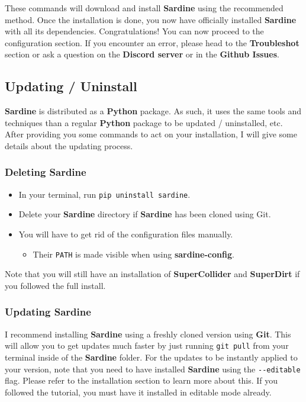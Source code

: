 \documentclass[11pt]{article}
\begin{document}
These commands will download and install \textbf{Sardine} using the recommended method. Once the installation is done, you now have officially installed \textbf{Sardine} with all its dependencies. Congratulations! You can now proceed to the configuration section. If you encounter an error, please head to the \textbf{Troubleshot} section or ask a question on the \textbf{Discord server} or in the \textbf{Github Issues}.

\subsection{Updating / Uninstall}
\label{sec:org53e2a76}

\textbf{Sardine} is distributed as a \textbf{Python} package. As such, it uses the same tools and techniques than a regular \textbf{Python} package to be updated / uninstalled, etc. After providing you some commands to act on your installation, I will give some details about the updating process.

\subsubsection{Deleting Sardine}
\label{sec:org95e7158}

\begin{itemize}
\item In your terminal, run \texttt{pip uninstall sardine}.
\item Delete your \textbf{Sardine} directory if \textbf{Sardine} has been cloned using Git.
\item You will have to get rid of the configuration files manually.
\begin{itemize}
\item Their \texttt{PATH} is made visible when using \textbf{sardine-config}.
\end{itemize}
\end{itemize}

Note that you will still have an installation of \textbf{SuperCollider} and \textbf{SuperDirt} if you followed the full install.

\subsubsection{Updating Sardine}
\label{sec:org8012973}

I recommend installing \textbf{Sardine} using a freshly cloned version using \textbf{Git}. This will allow you to get updates much faster by just running \texttt{git pull} from your terminal inside of the \textbf{Sardine} folder. For the updates to be instantly applied to your version, note that you need to have installed \textbf{Sardine} using the \texttt{-{}-editable} flag. Please refer to the installation section to learn more about this. If you followed the tutorial, you must have it installed in editable mode already.
\end{document}
